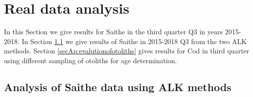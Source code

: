 \documentclass[a4paper 12pt]{article}
\numberwithin{equation}{section}
\begin{document}
\section{Real data analysis}
\label{secAP:realdataanalysis}

In this Section we give results for Saithe in the third quarter Q3  in years 2015-2018. In Section \ref{secAp:saitheusing ALKmethods} we give results of Saithe in 2015-2018 Q3 from the two ALK methods. Section \ref{secAp:evalutionofotoliths} gives results for Cod in third quarter using different sampling of otoliths for age determination.




\subsection{Analysis of Saithe data using ALK methods}
\label{secAp:saitheusing ALKmethods}
\clearpage
\end{document}
